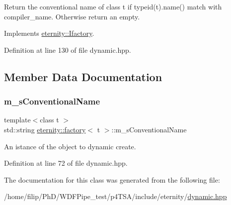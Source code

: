 Return the conventional name of class t if typeid(t).name() match with compiler\+\_\+name. Otherwise return an empty. 

Implements \hyperlink{classeternity_1_1_ifactory_a6c2afa73d61aaa81233ab1216c508252}{eternity\+::\+Ifactory}.



Definition at line 130 of file dynamic.\+hpp.



\subsection{Member Data Documentation}
\mbox{\label{classeternity_1_1factory_abf647d721a959e2a9728ff79b2bf094d}} 
\subsubsection{\texorpdfstring{m\+\_\+s\+Conventional\+Name}{m\_sConventionalName}}
{\footnotesize\ttfamily template$<$class t $>$ \\
std\+::string \hyperlink{classeternity_1_1factory}{eternity\+::factory}$<$ t $>$\+::m\+\_\+s\+Conventional\+Name\hspace{0.3cm}{\ttfamily [private]}}



An istance of the object to dynamic create. 



Definition at line 72 of file dynamic.\+hpp.



The documentation for this class was generated from the following file\+:\begin{DoxyCompactItemize}
\item 
/home/filip/\+Ph\+D/\+W\+D\+F\+Pipe\+\_\+test/p4\+T\+S\+A/include/eternity/\hyperlink{dynamic_8hpp}{dynamic.\+hpp}\end{DoxyCompactItemize}
